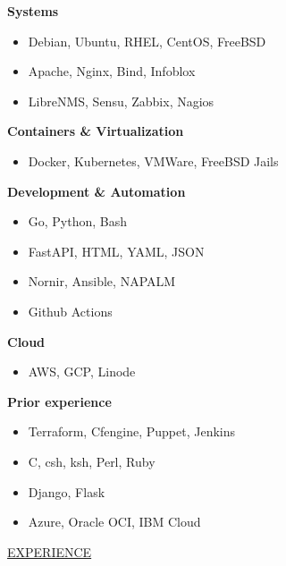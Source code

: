 \documentclass[11pt]{article}
\newcommand{\betteruline}[1]{
    \uline{#1}
}
\newcommand{\sectiontitle}[1]{
    \begingroup
        \titlebold{}
        \betteruline{\Large\uppercase{#1}  }
        \vspace{1.7mm}
    \endgroup
}
\newcommand{\sectioncontent}[1]{
    \begingroup
        \begin{FlushLeft}
        \vspace{-3mm}
        \sffamily\small#1
        \end{FlushLeft}
    \endgroup
    \vspace{2mm}
}
\newcommand{\spacevv}{
    \vspace{2mm}
}
\begin{document}
\begin{paracol}{2}
{        \textbf{Systems} \\
        \begin{itemize}
            \item Debian, Ubuntu, RHEL, CentOS, FreeBSD
            \item Apache, Nginx, Bind, Infoblox
            \item LibreNMS, Sensu, Zabbix, Nagios
        \end{itemize}
        \spacevv{}

        \textbf{Containers \& Virtualization} \\
        \begin{itemize}
            \item Docker, Kubernetes, VMWare, FreeBSD Jails
        \end{itemize}

        \textbf{Development \& Automation} \\
        \begin{itemize}
          \item Go, Python, Bash
          \item FastAPI, HTML, YAML, JSON
          \item Nornir, Ansible, NAPALM
          \item Github Actions
        \end{itemize}
        \spacevv{}

        \textbf{Cloud} \\
        \begin{itemize}
            \item AWS, GCP, Linode
        \end{itemize}
        \spacevv{}

        \textbf{Prior experience} \\
        \begin{itemize}
            \item Terraform, Cfengine, Puppet, Jenkins
            \item C, csh, ksh, Perl, Ruby
            \item Django, Flask
            \item Azure, Oracle OCI, IBM Cloud
        \end{itemize}
    }



    \switchcolumn{}

    \sectiontitle{experience}
    \sectioncontent{

}
\end{paracol}
\end{document}
